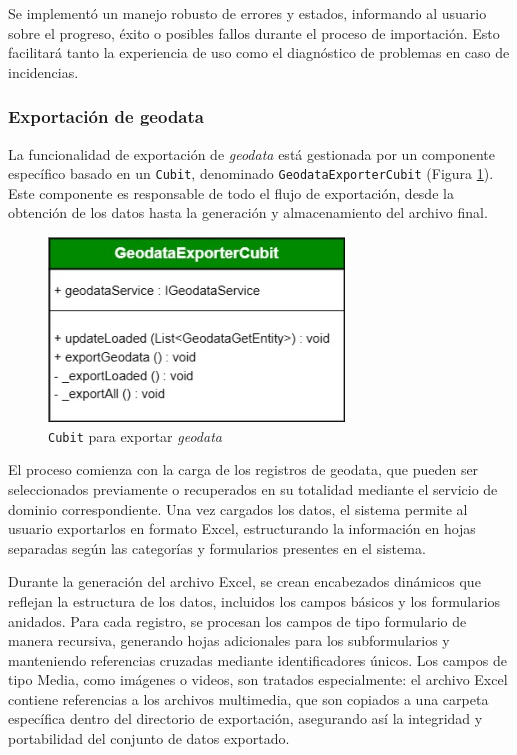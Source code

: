 \documentclass{article}
\begin{document}
Se implementó un manejo robusto de errores y estados, informando al usuario sobre el progreso, éxito o posibles fallos durante el proceso de importación. Esto facilitará tanto la experiencia de uso como el diagnóstico de problemas en caso de incidencias.

\subsubsection{Exportación de geodata}

La funcionalidad de exportación de \textit{geodata} está gestionada por un componente específico basado en un \texttt{Cubit}, denominado \texttt{GeodataExporterCubit} (Figura \ref{fig:geodataexporter}). Este componente es responsable de todo el flujo de exportación, desde la obtención de los datos hasta la generación y almacenamiento del archivo final.

\begin{figure}[H]
  \centering
  \includegraphics[width=0.7\textwidth]{images/geodata_exporter.jpg}
  \caption{\texttt{Cubit} para exportar \textit{geodata}}
  \label{fig:geodataexporter}
\end{figure}

El proceso comienza con la carga de los registros de geodata, que pueden ser seleccionados previamente o recuperados en su totalidad mediante el servicio de dominio correspondiente. Una vez cargados los datos, el sistema permite al usuario exportarlos en formato Excel, estructurando la información en hojas separadas según las categorías y formularios presentes en el sistema.

Durante la generación del archivo Excel, se crean encabezados dinámicos que reflejan la estructura de los datos, incluidos los campos básicos y los formularios anidados. Para cada registro, se procesan los campos de tipo formulario de manera recursiva, generando hojas adicionales para los subformularios y manteniendo referencias cruzadas mediante identificadores únicos. Los campos de tipo Media, como imágenes o videos, son tratados especialmente: el archivo Excel contiene referencias a los archivos multimedia, que son copiados a una carpeta específica dentro del directorio de exportación, asegurando así la integridad y portabilidad del conjunto de datos exportado.
\end{document}
